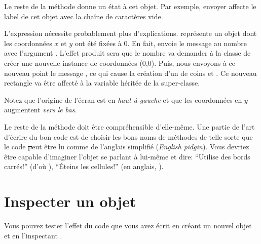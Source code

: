 \documentclass[a4paper,10pt,twoside]{book}
\begin{document}
Le reste de la méthode donne un état à cet objet.
Par exemple, envoyer  affecte le label de cet objet avec la chaîne de caractères vide.

L'expression  nécessite probablement plus d'explications.
 représente un objet  dont les coordonnées $x$ et $y$ ont été fixées à 0.
En fait,  envoie le message %
au nombre  avec l'argument .
L'effet produit sera que le nombre  va demander à la classe  de créer une nouvelle instance de coordonnées (0,0).
Puis, nous envoyons à ce nouveau point le message , ce qui cause la création d'un  de coins  et .
Ce nouveau rectangle va \^etre affecté à la variable  héritée de la super-classe.

Notez que l'origine de l'écran \pharo est en \emph{haut à gauche} et que les coordonnées en $y$ augmentent \emph{vers le bas}.

Le reste de la méthode doit \^etre compréhensible d'elle-m\^eme.
Une partie de l'art d'écrire du bon code \st est de choisir les bons
noms de méthodes de telle sorte que le code \st peut \^etre lu comme
de l'anglais simplifié (\emph{English pidgin}).  
Vous devriez \^etre capable d'imaginer l'objet se parlant à lui-m\^eme et
dire:  ``Utilise des bords carrés!'' (d'o\`u ),
``Éteins les cellules!'' (en anglais, ).

\section{Inspecter un objet}

Vous pouvez tester l'effet du code que vous avez écrit en créant un
nouvel objet  et en l'inspectant
.
\end{document}
